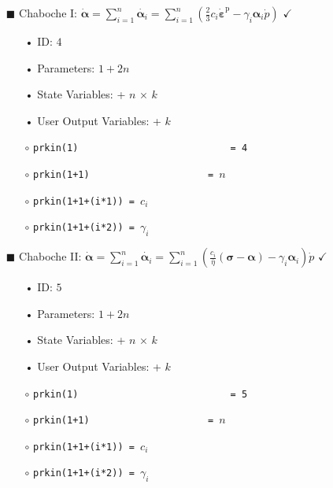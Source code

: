 \documentclass[11pt,a4paper,twoside,final,onecolumn,titlepage]{article}
\newcommand{\verified}{\hspace{0.5pt} {\LARGE $\checkmark$}}
\begin{document}
\begin{itemize}
	\item[\tiny$\blacksquare$] Chaboche I: $\displaystyle \dot{\bm{\alpha}}=\sum_{i=1}^{n}\dot{\bm{\alpha}_i}=\sum_{i=1}^{n}\left(\frac{2}{3}c_i\dot{\bm{\varepsilon}}^\textrm{p} -\gamma_{i}\bm{\alpha}_i\dot{p}\right)$ \verified{}
	\begin{itemize}
		\item[•] ID: $4$
		\item[•] Parameters: $1+2n$
		\item[•] State Variables: + $n$ $\times$ $k$
		\item[•] User Output Variables: + $k$\\
		\item[$\circ$] \texttt{prkin(1)\,\,\,\,\,\,\,\,\,\,\,\,\,\,\,\,\,\,\,\,\,\,\,\,\,\,\,= 4}
		\item[$\circ$] \texttt{prkin(1+1)\,\,\,\,\,\,\,\,\,\,\,\,\,\,\,\,\,\,\,\,\,= $n$}
		\item[$\circ$] \texttt{prkin(1+1+(i*1)) = $c_i$}
		\item[$\circ$] \texttt{prkin(1+1+(i*2)) = $\gamma_i$}\\
	\end{itemize}
\end{itemize}

\pagebreak
\begin{itemize}
	\item[\tiny$\blacksquare$] Chaboche II: $\displaystyle \dot{\bm{\alpha}}=\sum_{i=1}^{n}\dot{\bm{\alpha}_i}=\sum_{i=1}^{n}\left(\frac{c_i}{\bar{\eta}}\left(\bm{\sigma}-\bm{\alpha}\right)-\gamma_{i}\bm{\alpha}_i\right)\dot{p}$ \verified{}
	\begin{itemize}
		\item[•] ID: $5$
		\item[•] Parameters: $1+2n$
		\item[•] State Variables: + $n$ $\times$ $k$
		\item[•] User Output Variables: + $k$\\
		\item[$\circ$] \texttt{prkin(1)\,\,\,\,\,\,\,\,\,\,\,\,\,\,\,\,\,\,\,\,\,\,\,\,\,\,\,= 5}
		\item[$\circ$] \texttt{prkin(1+1)\,\,\,\,\,\,\,\,\,\,\,\,\,\,\,\,\,\,\,\,\,= $n$}
		\item[$\circ$] \texttt{prkin(1+1+(i*1)) = $c_i$}
		\item[$\circ$] \texttt{prkin(1+1+(i*2)) = $\gamma_i$}\\
	\end{itemize}
\end{itemize}
\end{document}
